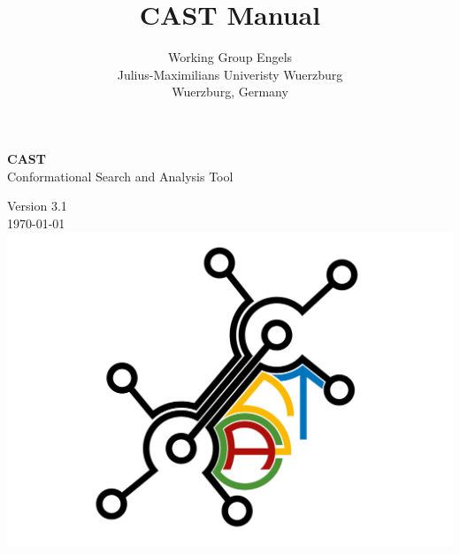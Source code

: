 \documentclass[10pt,a4paper]{article} %
\title{CAST Manual}
\author{Working Group Engels \\
	Julius-Maximilians Univeristy Wuerzburg \\
	Wuerzburg, Germany}
\begin{document}

\begin{center} 
	{\LARGE {\Huge \textbf{CAST}} \\ \vspace{1cm} Conformational Search and Analysis Tool}

    
    \vspace{1cm}
	Version 3.1 \\
	\today
    \vspace{2cm}
	\includegraphics[width=\textwidth]{img/CAST_CMYK_small.png}
	\end{center}


    \newpage

	\newpage
	\tableofcontents

\end{document}

